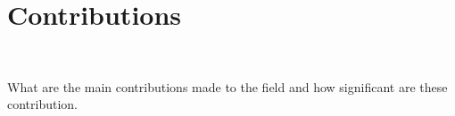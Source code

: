 
\section{Contributions}~\label{cont}
\label{section:Discussion:Contributions}

What are the main contributions made to the field and how significant are these contribution.  

